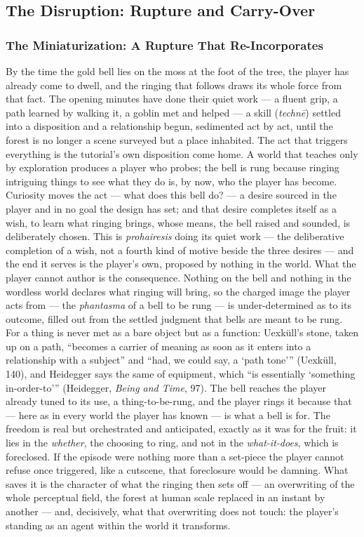 \documentclass{article}
\begin{document}
\bigskip

\subsection*{The Disruption: Rupture and Carry-Over}

\subsubsection*{The Miniaturization: A Rupture That Re-Incorporates}

By the time the gold bell lies on the moss at the foot of the tree, the player has already come to dwell, and the ringing that follows draws its whole force from that fact. The opening minutes have done their quiet work — a fluent grip, a path learned by walking it, a goblin met and helped — a skill (\textit{technē}) settled into a disposition and a relationship begun, sedimented act by act, until the forest is no longer a scene surveyed but a place inhabited. The act that triggers everything is the tutorial's own disposition come home. A world that teaches only by exploration produces a player who probes; the bell is rung because ringing intriguing things to see what they do is, by now, who the player has become. Curiosity moves the act — what does this bell do? — a desire sourced in the player and in no goal the design has set; and that desire completes itself as a wish, to learn what ringing brings, whose means, the bell raised and sounded, is deliberately chosen. This is \textit{prohairesis} doing its quiet work — the deliberative completion of a wish, not a fourth kind of motive beside the three desires — and the end it serves is the player's own, proposed by nothing in the world. What the player cannot author is the consequence. Nothing on the bell and nothing in the wordless world declares what ringing will bring, so the charged image the player acts from — the \textit{phantasma} of a bell to be rung — is under-determined as to its outcome, filled out from the settled judgment that bells are meant to be rung. For a thing is never met as a bare object but as a function: Uexküll's stone, taken up on a path, ``becomes a carrier of meaning as soon as it enters into a relationship with a subject'' and ``had, we could say, a `path tone''' (Uexküll, 140), and Heidegger says the same of equipment, which ``is essentially `something in-order-to''' (Heidegger, \textit{Being and Time}, 97). The bell reaches the player already tuned to its use, a thing-to-be-rung, and the player rings it because that — here as in every world the player has known — is what a bell is for. The freedom is real but orchestrated and anticipated, exactly as it was for the fruit: it lies in the \textit{whether}, the choosing to ring, and not in the \textit{what-it-does}, which is foreclosed. If the episode were nothing more than a set-piece the player cannot refuse once triggered, like a cutscene, that foreclosure would be damning. What saves it is the character of what the ringing then sets off — an overwriting of the whole perceptual field, the forest at human scale replaced in an instant by another — and, decisively, what that overwriting does not touch: the player's standing as an agent within the world it transforms.
\end{document}
